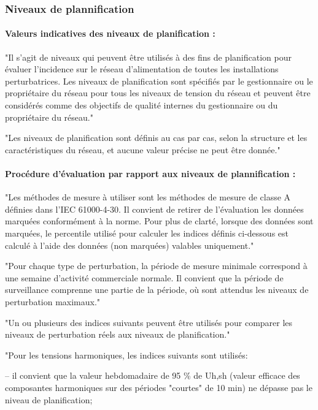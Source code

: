 \subsubsection{Niveaux de plannification}

\paragraph{Valeurs indicatives des niveaux de planification :}

"Il s'agit de niveaux qui peuvent être utilisés à des fins de planification pour évaluer l'incidence sur le réseau d'alimentation de toutes les installations perturbatrices. Les niveaux de planification sont spécifiés par le gestionnaire ou le propriétaire du réseau pour tous les niveaux de tension du réseau et peuvent être considérés comme des objectifs de qualité internes du gestionnaire ou du propriétaire du réseau."

"Les niveaux de planification sont définis au cas par cas, selon la structure et les caractéristiques du réseau, et aucune valeur précise ne peut être donnée."


\paragraph{Procédure d'évaluation par rapport aux niveaux de plannification :}

"Les méthodes de mesure à utiliser sont les méthodes de mesure de classe A définies dans l'IEC 61000-4-30. Il convient de retirer de l'évaluation les données marquées conformément à la norme. Pour plus de clarté, lorsque des données sont marquées, le percentile utilisé pour calculer les indices définis ci-dessous est calculé à l'aide des données (non marquées) valables uniquement."

"Pour chaque type de perturbation, la période de mesure minimale correspond à une semaine d'activité commerciale normale. Il convient que la période de surveillance comprenne une partie de la période, où sont attendus les niveaux de perturbation maximaux."

"Un ou plusieurs des indices suivants peuvent être utilisés pour comparer les niveaux de perturbation réels aux niveaux de planification."

"Pour les tensions harmoniques, les indices suivants sont utilisés:

– il convient que la valeur hebdomadaire de 95 \% de Uh,sh (valeur efficace des composantes harmoniques sur des périodes "courtes" de 10 min) ne dépasse pas le niveau de planification;

